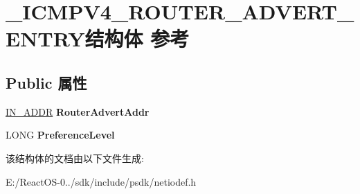 \hypertarget{struct___i_c_m_p_v4___r_o_u_t_e_r___a_d_v_e_r_t___e_n_t_r_y}{}\section{\+\_\+\+I\+C\+M\+P\+V4\+\_\+\+R\+O\+U\+T\+E\+R\+\_\+\+A\+D\+V\+E\+R\+T\+\_\+\+E\+N\+T\+R\+Y结构体 参考}
\label{struct___i_c_m_p_v4___r_o_u_t_e_r___a_d_v_e_r_t___e_n_t_r_y}
\subsection*{Public 属性}
\begin{DoxyCompactItemize}
\item 
\mbox{\label{struct___i_c_m_p_v4___r_o_u_t_e_r___a_d_v_e_r_t___e_n_t_r_y_adee623c343cee20d631272d919f93755}} 
\hyperlink{structin__addr}{I\+N\+\_\+\+A\+D\+DR} {\bfseries Router\+Advert\+Addr}
\item 
\mbox{\label{struct___i_c_m_p_v4___r_o_u_t_e_r___a_d_v_e_r_t___e_n_t_r_y_a5a4272abe9bbb2019fdbc90fca033a25}} 
L\+O\+NG {\bfseries Preference\+Level}
\end{DoxyCompactItemize}


该结构体的文档由以下文件生成\+:\begin{DoxyCompactItemize}
\item 
E\+:/\+React\+O\+S-\/0../sdk/include/psdk/netiodef.\+h\end{DoxyCompactItemize}
